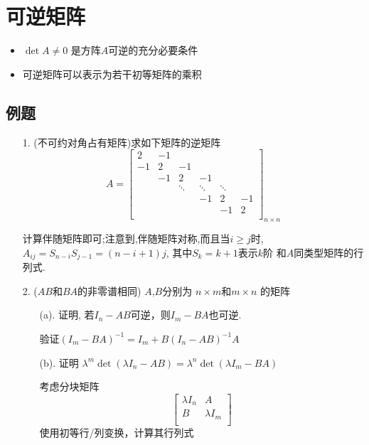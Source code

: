 \section{可逆矩阵}
\begin{itemize}
\item $\det A \ne 0$ 是方阵$A$可逆的充分必要条件
\item 可逆矩阵可以表示为若干初等矩阵的乘积
\end{itemize}

\subsection*{例题}
\begin{itemize}
	\item[1.] (不可约对角占有矩阵)求如下矩阵的逆矩阵
	\begin{equation} \nonumber
	A = \begin{bmatrix}
		2& -1& & & & \\
		-1& 2&-1&& & \\
		& -1& 2& -1& &\\
		&& \ddots& \ddots& \ddots\\
		&&& -1& 2& -1\\
		&&&& -1& 2\\
	\end{bmatrix}_{n \times n}
	\end{equation}
	\begin{solution}
		计算伴随矩阵即可;注意到,伴随矩阵对称,而且当$i\ge j$时,
		$A_{ij}= S_{n-i}S_{j-1} = (n-i+1)j$, 其中$S_{k} = k+1$表示$k$阶
		和$A$同类型矩阵的行列式.
	\end{solution}
	\vspace{2cm}

	\item[2.] ($AB$和$BA$的非零谱相同) $A$,$B$分别为 $n\times m$和$m\times n$
	的矩阵
	\begin{itemize}
		\item [(a).] 证明, 若$I_n - AB$可逆，则$I_m - BA$也可逆.
		\begin{solution}
			验证$(I_m - BA)^{-1} = I_m + B(I_n-AB)^{-1}A$
		\end{solution}
		\vspace{2cm}

		\item [(b).] 证明  $\lambda^{m}\det(\lambda I_n - AB) = 
		                   \lambda^{n}\det(\lambda I_m - BA)$
		\begin{solution}
			考虑分块矩阵
			\begin{equation} \nonumber
			\begin{bmatrix}
				\lambda I_n & A\\
				B& \lambda I_m\\
			\end{bmatrix}
			\end{equation}
			使用初等行/列变换，计算其行列式
		\end{solution}
		\vspace{2cm}
	\end{itemize}
\end{itemize}

